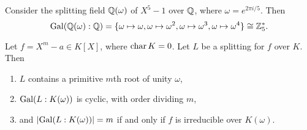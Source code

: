 \begin{example}
  Consider the splitting field $\mathbb{Q}(\omega)$ of $X^5 - 1$
  over $\mathbb{Q}$, where $\omega = e^{2\pi i / 5}$. Then
  \[
    \operatorname{Gal}(\mathbb{Q}(\omega) : \mathbb{Q})
    = \{\omega \mapsto \omega, \omega \mapsto \omega^2, \omega \mapsto \omega^3, \omega \mapsto \omega^4\}
    \cong \mathbb{Z}_5^*.
  \]
\end{example}

\begin{theorem}
  \label{thm:galois-group-of-xm-a}
  Let $f = X^m - a \in K[X]$, where $\operatorname{char} K = 0$.
  Let $L$ be a splitting for $f$ over $K$. Then
  \begin{enumerate}
    \item $L$ contains a primitive $m$th root of unity $\omega$,
    \item $\operatorname{Gal}(L : K(\omega))$ is cyclic, with
      order dividing $m$,
    \item and $|{\operatorname{Gal}(L : K(\omega))}| = m$ if and only if
      $f$ is irreducible over $K(\omega)$.
  \end{enumerate}
\end{theorem}

